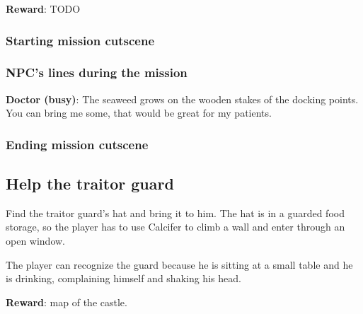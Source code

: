 
\textbf{Reward}: TODO

\subsubsection*{Starting mission cutscene}
\begin{screenplay}

\end{screenplay}


\subsubsection*{NPC's lines during the mission}
\textbf{Doctor (busy)}: The seaweed grows on the wooden stakes of the docking points. You can bring me some, that would be great for my patients.

\subsubsection*{Ending mission cutscene}
\begin{screenplay}

\end{screenplay}


\subsection{Help the traitor guard}
Find the traitor guard's hat and bring it to him. The hat is in a guarded food storage, so the player has to use Calcifer to climb a wall and enter through an open window.

The player can recognize the guard because he is sitting at a small table and he is drinking, complaining himself and shaking his head.

\textbf{Reward}: map of the castle.

